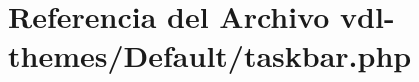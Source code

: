 \hypertarget{taskbar_8php}{\section{Referencia del Archivo vdl-\/themes/\-Default/taskbar.php}
\label{taskbar_8php}
}
